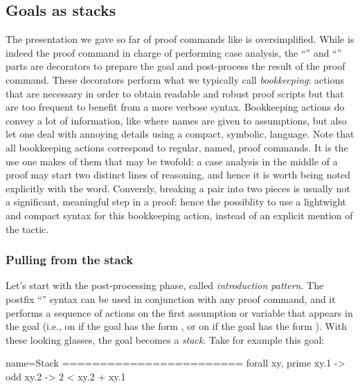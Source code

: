 \subsection{Goals as stacks}\label{ssec:stack}

The presentation we gave so far of proof commands like 
is oversimplified.  While  is indeed the proof command in
charge of performing case analysis, the ``'' and ``\C{=> [|m]}''
parts are decorators to prepare the goal and post-process the result of
the proof command.  These decorators perform what we typically call
\emph{bookkeeping}: actions that are necessary in order to obtain readable and
robust proof scripts but that are too frequent to benefit from a more verbose
syntax.  Bookkeeping actions do convey a lot of information, like where
names are given to assumptions, but also let one deal with annoying details
using a compact, symbolic, language.  Note that all bookkeeping actions
correspond to regular, named, proof commands.  It is the use one makes of them
that may be twofold: a case analysis in the middle of a proof may start two
distinct lines of reasoning, and hence it is worth being noted explicitly with
the  word. Conversly, breaking a pair into two pieces is
usually not a significant, meaningful step in a proof: hence the
possiblity to use a lightwight and compact syntax for this bookkeeping
action, instead of an explicit mention of the  tactic.

\subsubsection{Pulling from the stack}

Let's start with the post-processing phase, called \emph{introduction pattern}.
The postfix ``'' syntax can be used in conjunction with any proof
command, and it performs a sequence of actions on the first
assumption or variable that appears in the goal (i.e., on
 if the goal has the form , or on
 if the goal has the form ).
With these looking glasses, the goal becomes a
\emph{stack}. Take for example this goal:

\begin{coqout}{name=Stack}{}
========================
forall xy, prime xy.1 -> odd xy.2 -> 2 < xy.2 + xy.1
\end{coqout}

